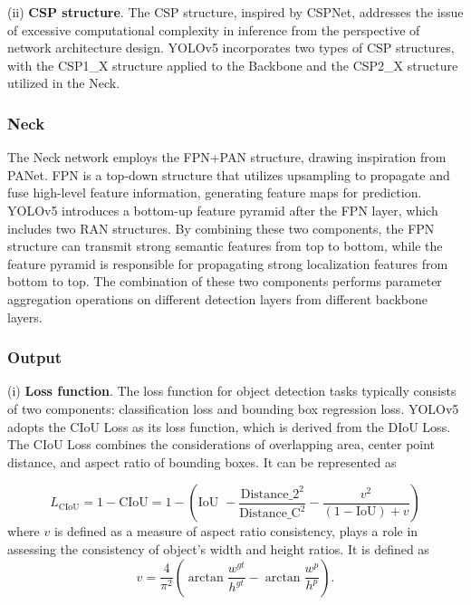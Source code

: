 (ii) \textbf{CSP structure}. The CSP structure, inspired by CSPNet\cite{wang2020cspnet}, addresses the issue of excessive computational complexity in inference from the perspective of network architecture design. YOLOv5 incorporates two types of CSP structures, with the CSP1\_X structure applied to the Backbone and the CSP2\_X structure utilized in the Neck.

\subsubsection{Neck}
The Neck network employs the FPN+PAN structure, drawing inspiration from PANet\cite{liu2018path}. FPN is a top-down structure that utilizes upsampling to propagate and fuse high-level feature information, generating feature maps for prediction. YOLOv5 introduces a bottom-up feature pyramid after the FPN layer, which includes two RAN structures. By combining these two components, the FPN structure can transmit strong semantic features from top to bottom, while the feature pyramid is responsible for propagating strong localization features from bottom to top. The combination of these two components performs parameter aggregation operations on different detection layers from different backbone layers.

\subsubsection{Output}

(i) \textbf{Loss function}. The loss function for object detection tasks typically consists of two components: classification loss and bounding box regression loss. YOLOv5 adopts the CIoU Loss\cite{zheng2021enhancing} as its loss function, which is derived from the DIoU Loss\cite{zheng2020distance}. The CIoU Loss combines the considerations of overlapping area, center point distance, and aspect ratio of bounding boxes. It can be represented as

\begin{equation}
L_\text{CIoU} = 1 - \text{CIoU} = 1 - (\text{IoU } - \frac{\text{Distance\_2} ^ 2 }{\text{Distance\_C} ^ 2 } - \frac{v^2}{(1-\text{IoU})+v}   )
\label{eq_loss}
\end{equation}
where $v$ is defined as a measure of aspect ratio consistency, plays a role in assessing the consistency of object's width and height ratios. It is defined as
\begin{equation}
v=\frac{4}{\pi ^2}(\arctan \frac{w^{gt}}{h^{gt}}-\arctan \frac{w^{p}}{h^{p}}).
\label{eq_v}
\end{equation}

